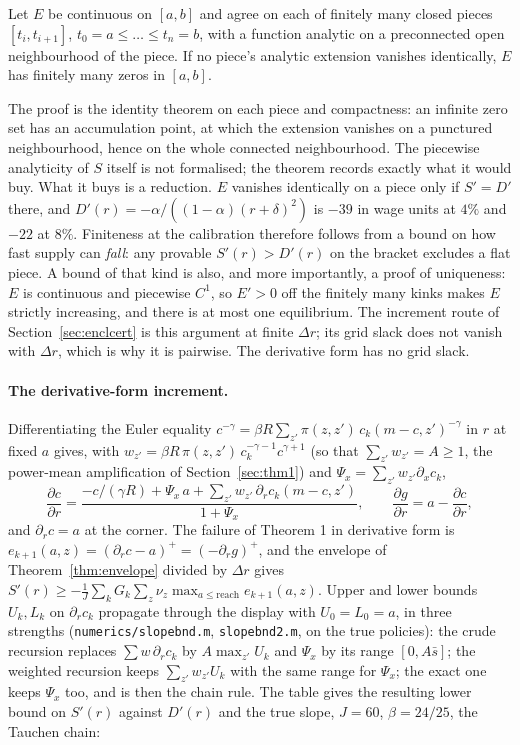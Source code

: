 \begin{theorem}\label{thm:finite}
Let $E$ be continuous on $[a,b]$ and agree on each of finitely many closed pieces
$[t_i,t_{i+1}]$, $t_0=a\le\dots\le t_n=b$, with a function analytic on a preconnected open
neighbourhood of the piece. If no piece's analytic extension vanishes identically, $E$ has finitely
many zeros in $[a,b]$.
\end{theorem}

The proof is the identity theorem on each piece and compactness: an infinite zero set has an
accumulation point, at which the extension vanishes on a punctured neighbourhood, hence on the
whole connected neighbourhood. The piecewise analyticity of $S$ itself is not formalised; the
theorem records exactly what it would buy. What it buys is a reduction. $E$ vanishes identically on
a piece only if $S'=D'$ there, and $D'(r)=-\alpha/((1-\alpha)(r+\delta)^2)$ is $-39$ in wage units
at $4\%$ and $-22$ at $8\%$. Finiteness at the calibration therefore follows from a bound on how
fast supply can \emph{fall}: any provable $S'(r)>D'(r)$ on the bracket excludes a flat piece. A
bound of that kind is also, and more importantly, a proof of uniqueness: $E$ is continuous and
piecewise $C^1$, so $E'>0$ off the finitely many kinks makes $E$ strictly increasing, and there is
at most one equilibrium. The increment route of Section~\ref{sec:enclcert} is this argument at finite
$\Delta r$; its grid slack does not vanish with $\Delta r$, which is why it is pairwise. The
derivative form has no grid slack.

\paragraph{The derivative-form increment.} Differentiating the Euler equality
$c^{-\gamma}=\beta R\sum_{z'}\pi(z,z')\,c_k(m-c,z')^{-\gamma}$ in $r$ at fixed $a$ gives, with
$w_{z'}=\beta R\,\pi(z,z')\,c_k^{-\gamma-1}c^{\gamma+1}$ (so that $\sum_{z'}w_{z'}=A\ge1$, the
power-mean amplification of Section~\ref{sec:thm1}) and $\Psi_x=\sum_{z'}w_{z'}\partial_xc_k$,
\[
\frac{\partial c}{\partial r}
=\frac{-c/(\gamma R)+\Psi_x\,a+\sum_{z'}w_{z'}\,\partial_rc_k(m-c,z')}{1+\Psi_x},
\qquad
\frac{\partial g}{\partial r}=a-\frac{\partial c}{\partial r},
\]
and $\partial_rc=a$ at the corner. The failure of Theorem 1 in derivative form is
$e_{k+1}(a,z)=(\partial_rc-a)^+=(-\partial_rg)^+$, and the envelope of Theorem~\ref{thm:envelope}
divided by $\Delta r$ gives
$S'(r)\ge-\frac1J\sum_kG_k\sum_z\nu_z\max_{a\le\text{reach}}e_{k+1}(a,z)$. Upper and lower bounds
$U_k,L_k$ on $\partial_rc_k$ propagate through the display with $U_0=L_0=a$, in three
strengths (\texttt{numerics/slopebnd.m}, \texttt{slopebnd2.m}, on the true policies): the crude
recursion replaces $\sum w\,\partial_rc_k$ by $A\max_{z'}U_k$ and $\Psi_x$ by its range
$[0,A\bar s]$; the weighted recursion keeps $\sum_{z'}w_{z'}U_k$ with the same range for $\Psi_x$;
the exact one keeps $\Psi_x$ too, and is then the chain rule. The table gives the resulting lower
bound on $S'(r)$ against $D'(r)$ and the true slope, $J=60$, $\beta=24/25$, the Tauchen chain:

